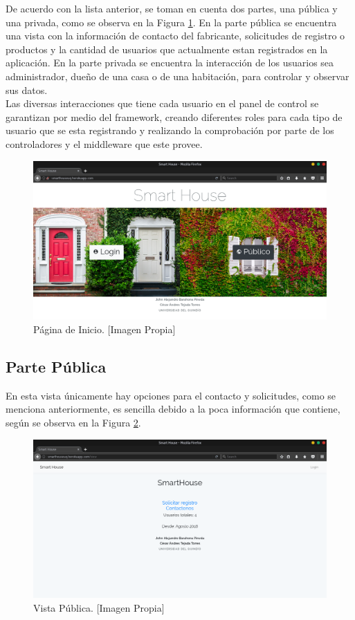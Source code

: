 De acuerdo con la lista anterior, se toman en cuenta dos partes, una pública y una privada, como se observa en la Figura \ref{fig:index}. En la parte pública se encuentra una vista con la información de contacto del fabricante, solicitudes de registro o productos y la cantidad de usuarios que actualmente estan registrados en la aplicación. En la parte privada se encuentra la interacción de los usuarios sea administrador, dueño de una casa o de una habitación, para controlar y observar sus datos.\\

Las diversas interacciones que tiene cada usuario en el panel de control se garantizan por medio del framework, creando diferentes roles para cada tipo de usuario que se esta registrando y realizando la comprobación por parte de los controladores y el middleware que este provee.\\

\begin{figure}[H]
\centering
\caption{Página de Inicio. [Imagen Propia]}
\label{fig:index}
\includegraphics[width=0.5\linewidth]{Imagenes/Index}
\end{figure}

\subsection{Parte Pública}

En esta vista únicamente hay opciones para el contacto y solicitudes, como se menciona anteriormente, es sencilla debido a la poca información que contiene, según se observa en la Figura \ref{fig:publicview}.

\begin{figure}[H]
\centering
\caption{Vista Pública. [Imagen Propia]}
\label{fig:publicview}
\includegraphics[width=0.5\linewidth]{Imagenes/Public_view}
\end{figure}

